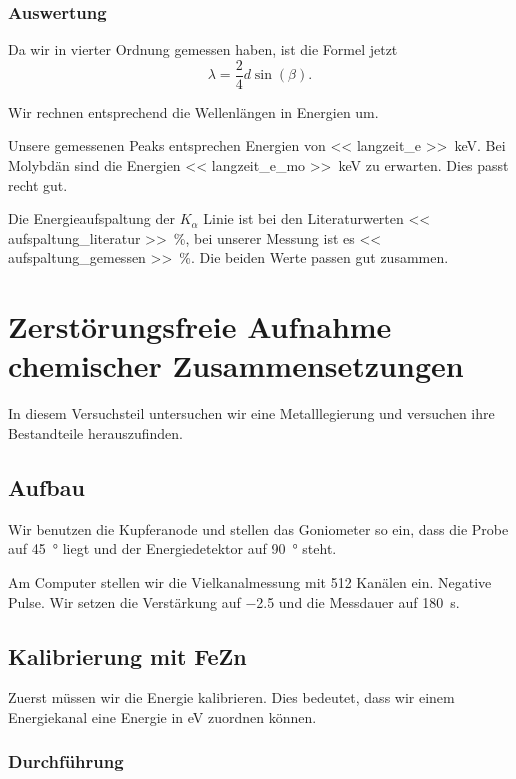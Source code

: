 \subsection{Auswertung}

Da wir in vierter Ordnung gemessen haben, ist die Formel jetzt
\[
    \lambda = \frac24 d \sin(\beta).
\]

Wir rechnen entsprechend die Wellenlängen in Energien um.

Unsere gemessenen Peaks entsprechen Energien von \SIlist{<< langzeit_e
>>}{\kilo\electronvolt}. Bei Molybdän sind die Energien \SIlist{<<
langzeit_e_mo >>}{\kilo\electronvolt} zu erwarten.
\parencite[Tabelle~1-2]{x-ray_data_booklet} Dies passt recht gut.

Die Energieaufspaltung der $K_\alpha$ Linie ist bei den Literaturwerten \SI{<<
aufspaltung_literatur >>}{\percent}, bei unserer Messung ist es \SI{<<
aufspaltung_gemessen >>}{\percent}. Die beiden Werte passen gut zusammen.

\chapter{Zerstörungsfreie Aufnahme chemischer Zusammensetzungen}

In diesem Versuchsteil untersuchen wir eine Metalllegierung und versuchen ihre
Bestandteile herauszufinden.

\section{Aufbau}

Wir benutzen die Kupferanode und stellen das Goniometer so ein, dass die Probe
auf \SI{45}{\degree} liegt und der Energiedetektor auf \SI{90}{\degree} steht.

Am Computer stellen wir die Vielkanalmessung mit 512 Kanälen ein. Negative
Pulse. Wir setzen die Verstärkung auf \num{-2.5} und die Messdauer auf
\SI{180}{\second}.

\section{Kalibrierung mit FeZn}

Zuerst müssen wir die Energie kalibrieren. Dies bedeutet, dass wir einem
Energiekanal eine Energie in \si{\electronvolt} zuordnen können.

\subsection{Durchführung}

